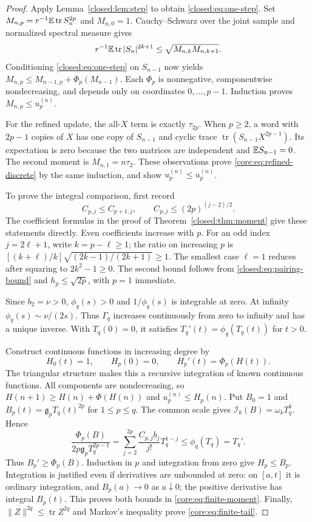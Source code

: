 \documentclass[11pt,a4paper]{article}
\theoremstyle{definition}\newtheorem{definition}[theorem]{Definition}
\theoremstyle{remark}\newtheorem{remark}[theorem]{Remark}
\numberwithin{equation}{section}
\newcommand{\gmom}{\mathfrak g}
\newcommand{\norm}[1]{\lVert#1\rVert}\newcommand{\ip}[2]{\langle#1,#2\rangle}
\DeclareMathOperator{\tr}{tr}\DeclareMathOperator{\rank}{rank}
\begin{document}
\begin{proof}
Apply Lemma~\ref{closed:lem:step} to obtain \eqref{closed:eq:one-step}.
Set $M_{n,p}=r^{-1}\E\tr S_n^{2p}$ and $M_{n,0}=1$.
Cauchy--Schwarz over the joint sample and normalized spectral measure
gives
\[
 r^{-1}\E\tr|S_n|^{2k+1}
 \le\sqrt{M_{n,k}M_{n,k+1}}.
\]
Conditioning \eqref{closed:eq:one-step} on $S_{n-1}$ now yields
$M_{n,p}\le M_{n-1,p}+\Phi_p(M_{n-1})$.
Each $\Phi_p$ is nonnegative, componentwise nondecreasing, and depends
only on coordinates $0,\ldots,p-1$. Induction proves
$M_{n,p}\le u_p^{(n)}$.

For the refined update, the all-$X$ term is exactly $\tau_{2p}$.
When $p\ge2$, a word with $2p-1$ copies of $X$ has one copy of
$S_{n-1}$ and cyclic trace $\tr(S_{n-1}X^{2p-1})$. Its expectation is
zero because the two matrices are independent and $\mathbb E S_{n-1}=0$.
The second moment is $M_{n,1}=n\tau_2$.
These observations prove \eqref{core:eq:refined-discrete} by the same
induction, and show $\widehat u_p^{(n)}\le u_p^{(n)}$.

To prove the integral comparison, first record
\begin{equation}\label{core:eq:coefficient-inequalities}
 C_{p,j}\le C_{p+1,j},\qquad
 C_{p,j}\le(2p)^{(j-2)/2}.
\end{equation}
The coefficient formulas in the proof of
Theorem~\ref{closed:thm:moment} give these statements directly.
Even coefficients increase with $p$. For an odd index $j=2\ell+1$,
write $k=p-\ell\ge1$; the ratio on increasing $p$ is
$[(k+\ell)/k]\sqrt{(2k-1)/(2k+1)}\ge1$.
The smallest case $\ell=1$ reduces after squaring to $2k^2-1\ge0$.
The second bound follows from \eqref{closed:eq:pairing-bound} and
$h_p\le\sqrt{2p}$, with $p=1$ immediate.

Since $b_2=\nu>0$, $\phi_q(s)>0$ and $1/\phi_q(s)$ is integrable at
zero. At infinity $\phi_q(s)\sim\nu/(2s)$.
Thus $\Gamma_q$ increases continuously from zero to infinity and has a
unique inverse. With $T_q(0)=0$, it satisfies
$T_q'(t)=\phi_q(T_q(t))$ for $t>0$.

Construct continuous functions in increasing degree by
\[
 H_0(t)=1,\qquad H_p(0)=0,\qquad H_p'(t)=\Phi_p(H(t)).
\]
The triangular structure makes this a recursive integration of known
continuous functions. All components are nondecreasing, so
$H(n+1)\ge H(n)+\Phi(H(n))$ and $u_p^{(n)}\le H_p(n)$.
Put $B_0=1$ and $B_p(t)=\gmom_pT_q(t)^{2p}$ for $1\le p\le q$.
The common scale gives $\mathcal I_k(B)=\omega_kT_q^k$. Hence
\[
 \frac{\Phi_p(B)}{2p\gmom_pT_q^{2p-1}}
 =\sum_{j=2}^{2p}\frac{C_{p,j}b_j}{j!}T_q^{1-j}
 \le\phi_q(T_q)=T_q'.
\]
Thus $B_p'\ge\Phi_p(B)$. Induction in $p$ and integration from zero
give $H_p\le B_p$. Integration is justified even if derivatives are
unbounded at zero: on $[a,t]$ it is ordinary integration, and
$B_p(a)\to0$ as $a\downarrow0$; the positive derivative has integral
$B_p(t)$. This proves both bounds in \eqref{core:eq:finite-moment}.
Finally, $\norm{Z}^{2q}\le\tr Z^{2q}$ and Markov's inequality prove
\eqref{core:eq:finite-tail}.
\end{proof}
\end{document}
